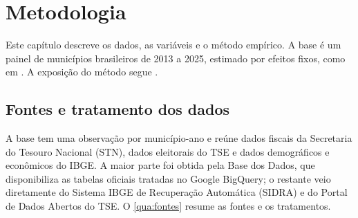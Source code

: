 
\chapter{Metodologia}\label{cap:metodologia}

Este capítulo descreve os dados, as variáveis e o método empírico. A base é um painel de municípios brasileiros de 2013 a 2025, estimado por efeitos fixos, como em \textcite{sakurai2009}. A exposição do método segue \textcite{wooldridge2002}.

\section{Fontes e tratamento dos dados}\label{sec:dados}

A base tem uma observação por município-ano e reúne dados fiscais da Secretaria do Tesouro Nacional (STN), dados eleitorais do TSE e dados demográficos e econômicos do IBGE. A maior parte foi obtida pela Base dos Dados, que disponibiliza as tabelas oficiais tratadas no Google BigQuery; o restante veio diretamente do Sistema IBGE de Recuperação Automática (SIDRA) e do Portal de Dados Abertos do TSE. O \autoref{qua:fontes} resume as fontes e os tratamentos.


